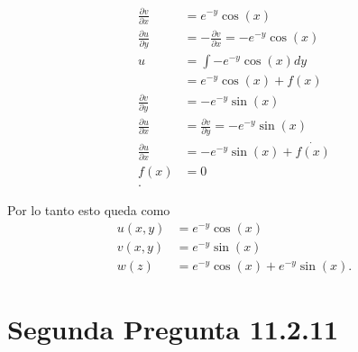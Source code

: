 \documentclass{report}
\begin{document}
\begin{itemize}
    \begin{align*}
      \frac{\partial v}{\partial x} &= e^{-y}\cos\left( x \right) \\
      \frac{\partial u}{\partial y} &= - \frac{\partial v}{\partial x} = -e^{-y}\cos\left( x \right)  \\
      u &= \int -e^{-y}\cos\left( x \right) dy \\
      &= e^{-y}\cos\left( x \right) + f\left( x \right)  \\
      \frac{\partial v}{\partial y} &= -e^{-y}\sin\left( x \right)  \\
      \frac{\partial u}{\partial x} &= \frac{\partial v}{\partial y} = -e^{-y}\sin\left( x \right) \\
      \frac{\partial u}{\partial x} &= - e^{-y}\sin\left( x \right) + \dot{f\left( x \right) }\\
      f\left( x \right) &= 0 \\
    .\end{align*}

    Por lo tanto esto queda como
    \begin{align*}
      u\left( x, y \right) &= e^{-y}\cos\left( x \right) \\
      v\left( x, y \right) &= e^{-y}\sin\left( x \right) \\
      w\left( z \right) &= e^{-y}\cos\left( x \right) + e^{-y}\sin\left( x \right)
    .\end{align*}
\end{itemize}

\chapter{Segunda Pregunta 11.2.11}
\label{chap:2}
\end{document}
